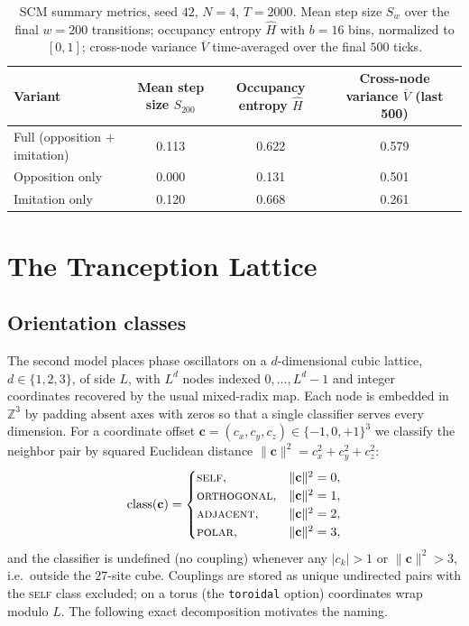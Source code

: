 \documentclass[11pt]{article}
\newcommand{\msFull}{0.113}
\newcommand{\msOpp}{0.000}
\newcommand{\msImit}{0.120}
\newcommand{\entFull}{0.622}
\newcommand{\entOpp}{0.131}
\newcommand{\entImit}{0.668}
\newcommand{\nvFull}{0.579}
\newcommand{\nvOpp}{0.501}
\newcommand{\nvImit}{0.261}
\begin{document}
\begin{table}[H]
\centering
\caption{SCM summary metrics, seed $42$, $N=4$, $T=2000$. Mean step size $S_w$ over the final $w=200$ transitions;
occupancy entropy $\hat H$ with $b=16$ bins, normalized to $[0,1]$; cross-node variance $\overline{V}$ time-averaged
over the final $500$ ticks.}
\label{tab:scm}
\begin{tabular}{lccc}
\toprule
Variant & \shortstack{Mean step\\ size $S_{200}$} & \shortstack{Occupancy\\ entropy $\hat H$}
        & \shortstack{Cross-node variance\\ $\overline{V}$ (last 500)} \\
\midrule
Full (opposition $+$ imitation) & \msFull & \entFull & \nvFull \\
Opposition only                 & \msOpp  & \entOpp  & \nvOpp  \\
Imitation only                  & \msImit & \entImit & \nvImit \\
\bottomrule
\end{tabular}
\end{table}

\section{The Tranception Lattice}
\label{sec:lattice}

\subsection{Orientation classes}
The second model places phase oscillators on a $d$-dimensional cubic lattice, $d\in\{1,2,3\}$, of side $L$, with
$L^d$ nodes indexed $0,\dots,L^d-1$ and integer coordinates recovered by the usual mixed-radix map. Each node is
embedded in $\mathbb{Z}^3$ by padding absent axes with zeros so that a single classifier serves every dimension. For
a coordinate offset $\mathbf{c}=(c_x,c_y,c_z)\in\{-1,0,+1\}^3$ we classify the neighbor pair by squared Euclidean
distance $\|\mathbf{c}\|^2=c_x^2+c_y^2+c_z^2$:
\begin{equation}
\text{class}(\mathbf{c})=
\begin{cases}
\textsc{self}, & \|\mathbf{c}\|^2=0,\\
\textsc{orthogonal}, & \|\mathbf{c}\|^2=1,\\
\textsc{adjacent}, & \|\mathbf{c}\|^2=2,\\
\textsc{polar}, & \|\mathbf{c}\|^2=3,
\end{cases}
\end{equation}
and the classifier is undefined (no coupling) whenever any $|c_k|>1$ or $\|\mathbf{c}\|^2>3$, i.e.\ outside the
$27$-site cube. Couplings are stored as unique undirected pairs with the \textsc{self} class excluded; on a torus
(the \texttt{toroidal} option) coordinates wrap modulo $L$. The following exact decomposition motivates the naming.
\end{document}
